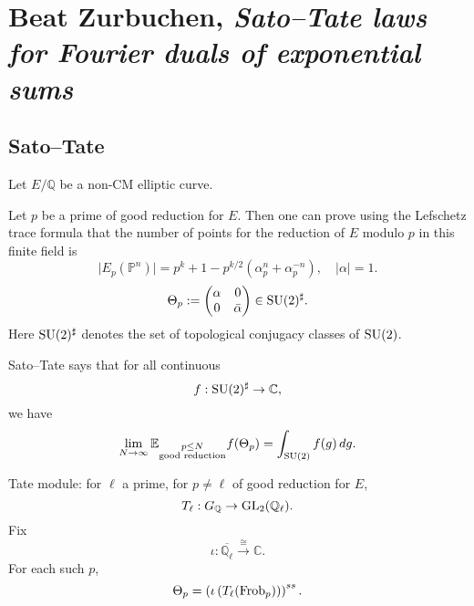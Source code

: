 \documentclass[reqno]{amsart} 
\begin{document}
\section{Beat Zurbuchen, \emph{Sato--Tate laws for Fourier duals of exponential sums}}

\subsection{Sato--Tate}
Let $E/\mathbb{Q}$ be a non-CM elliptic curve.

Let $p$ be a prime of good reduction for $E$.  Then one can prove using the Lefschetz trace formula that the number of points for the reduction of $E$ modulo $p$ in this finite field is
\begin{equation*}
  \lvert E_p(\mathbb{P}^n) \rvert = p^k + 1 - p^{k /2} \left( \alpha_p^n + \alpha_p^{- n} \right),
  \quad
  \lvert \alpha  \rvert = 1.
\end{equation*}
\begin{equation*}
  \Theta_p :=
  \begin{pmatrix}
    \alpha  & 0 \\
    0 & \bar{\alpha } \\
  \end{pmatrix}
  \in
  \operatorname{SU}(2)^{\sharp}.
\end{equation*}
Here $\operatorname{SU}(2)^{\sharp}$ denotes the set of topological conjugacy classes of $\operatorname{SU}(2)$.

Sato--Tate says that for all continuous
\begin{equation*}
  f : \operatorname{SU}(2)^{\sharp}
  \rightarrow \mathbb{C} ,
\end{equation*}
we have
\begin{equation*}
  \lim_{N \rightarrow \infty }
  \mathbb{E}_{
    \substack{
      p \leq N  \\
      \text{good reduction}
    }
  }
  f (\Theta_p )
  =
  \int_{\operatorname{SU}(2)} f(g) \, d g.
\end{equation*}

Tate module: for $\ell$ a prime, for $p \neq \ell$ of good reduction for $E$,
\begin{equation*}
  T_{\ell} : G_{\mathbb{Q} } \rightarrow \operatorname{GL}_2 (\mathbb{Q}_{\ell} ).
\end{equation*}
Fix
\begin{equation*}
  \iota : \overline{\mathbb{Q}_{\ell} } \xrightarrow{\cong } \mathbb{C}.
\end{equation*}
For each such $p$,
\begin{equation*}
  \Theta_p = \left( \iota \left( T_{\ell} (\operatorname{Frob}_p ) \right) \right)^{ss}.
\end{equation*}
\end{document}
